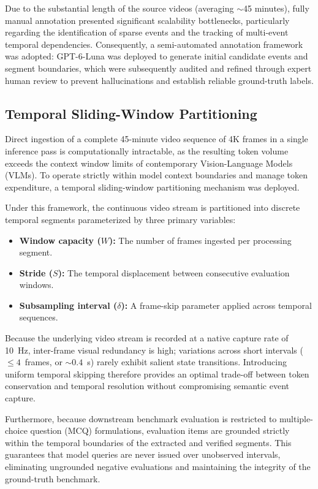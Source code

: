\documentclass[journal]{IEEEtran}
\begin{document}
Due to the substantial length of the source videos (averaging $\sim$45 minutes), fully manual annotation presented significant scalability bottlenecks, particularly regarding the identification of sparse events and the tracking of multi-event temporal dependencies. Consequently, a semi-automated annotation framework was adopted: GPT-6-Luna was deployed to generate initial candidate events and segment boundaries, which were subsequently audited and refined through expert human review to prevent hallucinations and establish reliable ground-truth labels.

\subsection{Temporal Sliding-Window Partitioning}

Direct ingestion of a complete 45-minute video sequence of 4K frames in a single inference pass is computationally intractable, as the resulting token volume exceeds the context window limits of contemporary Vision-Language Models (VLMs). To operate strictly within model context boundaries and manage token expenditure, a temporal sliding-window partitioning mechanism was deployed.

Under this framework, the continuous video stream is partitioned into discrete temporal segments parameterized by three primary variables:
\begin{itemize}
    \item \textbf{Window capacity ($W$):} The number of frames ingested per processing segment.
    \item \textbf{Stride ($S$):} The temporal displacement between consecutive evaluation windows.
    \item \textbf{Subsampling interval ($\delta$):} A frame-skip parameter applied across temporal sequences.
\end{itemize}

Because the underlying video stream is recorded at a native capture rate of 10~Hz, inter-frame visual redundancy is high; variations across short intervals ($\le 4$~frames, or $\sim 0.4$~s) rarely exhibit salient state transitions. Introducing uniform temporal skipping therefore provides an optimal trade-off between token conservation and temporal resolution without compromising semantic event capture.

Furthermore, because downstream benchmark evaluation is restricted to multiple-choice question (MCQ) formulations, evaluation items are grounded strictly within the temporal boundaries of the extracted and verified segments. This guarantees that model queries are never issued over unobserved intervals, eliminating ungrounded negative evaluations and maintaining the integrity of the ground-truth benchmark.
\end{document}
